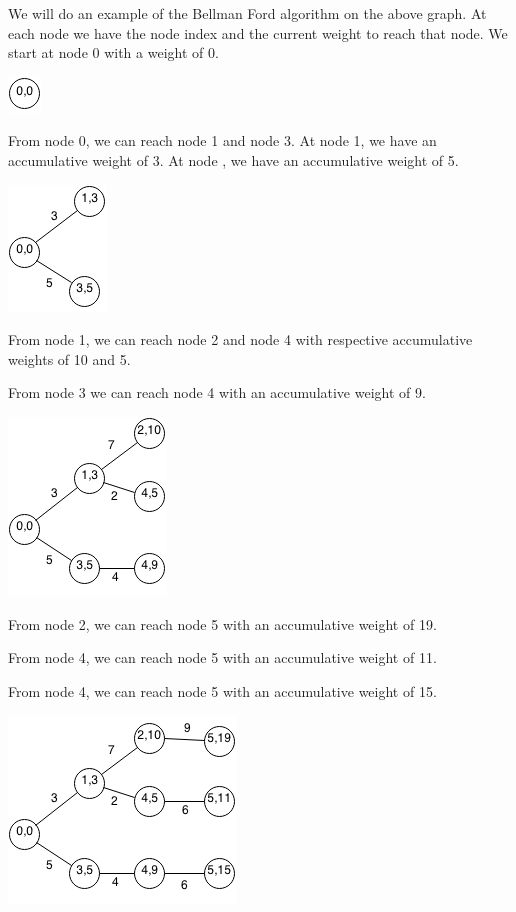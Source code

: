 \documentclass[11pt,oneside]{book}
\makeatletter
\def\maxwidth#1{\ifdim\Gin@nat@width>#1 #1\else\Gin@nat@width\fi}
\makeatother
\begin{document}
We will do an example of the Bellman Ford algorithm on the above graph. At each node we have the node index and the current weight to reach that node. We start at node 0 with a weight of 0.

\vspace{5px}\includegraphics[width=\maxwidth{\textwidth}]{bellmanford2.png}

From node 0, we can reach node 1 and node 3. At node 1, we have an accumulative weight of 3. At node , we have an accumulative weight of 5.

\vspace{5px}\includegraphics[width=\maxwidth{\textwidth}]{bellmanford3.png}

From node 1, we can reach node 2 and node 4 with respective accumulative weights of 10 and 5.

From node 3 we can reach node 4 with an accumulative weight of 9.

\vspace{5px}\includegraphics[width=\maxwidth{\textwidth}]{bellmanford4.png}

From node 2, we can reach node 5 with an accumulative weight of 19.

From node 4, we can reach node 5 with an accumulative weight of 11.

From node 4, we can reach node 5 with an accumulative weight of 15.

\vspace{5px}\includegraphics[width=\maxwidth{\textwidth}]{bellmanford5.png}
\end{document}
